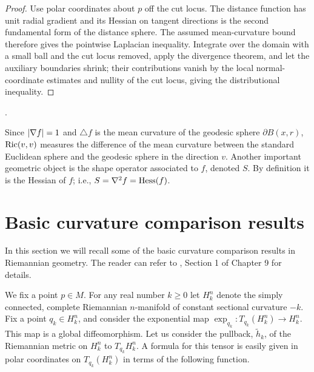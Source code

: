 \begin{proof}
\sketch

Use polar coordinates about $p$ off the cut locus. The distance function has unit radial gradient and its Hessian on tangent directions is the second fundamental form of the distance sphere. The assumed mean-curvature bound therefore gives the pointwise Laplacian inequality. Integrate over the domain with a small ball and the cut locus removed, apply the divergence theorem, and let the auxiliary boundaries shrink; their contributions vanish by the local normal-coordinate estimates and nullity of the cut locus, giving the distributional inequality.
\end{proof}
.

\medskip

Since $\left\vert\nabla f\right\vert = 1$ and $\triangle f$ is the mean curvature
of the geodesic sphere $\partial B(x,r)$, $\operatorname{Ric}(v,v)$ measures
the difference of the mean curvature between the standard Euclidean
sphere and the geodesic sphere in the direction $v$. Another
important geometric object  is the shape operator associated to $f$,
denoted $S$. By definition it is the Hessian of $f$; i.e.,
$S=\nabla^2f=\operatorname{Hess}(f)$.

\section{Basic curvature comparison results}
In this section we will recall some of the basic curvature
comparison results in Riemannian geometry. The reader can refer to
\cite{Petersen}, Section 1 of Chapter 9 for details.

\smallskip

We fix a point $p\in M$. For any real number $k\ge 0$ let $H^n_k$ denote the
simply connected, complete Riemannian $n$-manifold of constant sectional
curvature $-k$. Fix a point $q_k\in H^n_k$, and consider the exponential map
$\exp_{q_k}\colon T_{q_k}(H^n_k)\to H^n_k$. This map is a global
diffeomorphism. Let us consider the pullback, $\tilde h_k$, of the Riemannian
metric on $H^n_k$ to $T_{q_k}H^n_k$. A formula for this tensor is easily given
in polar coordinates on $T_{q_k}(H^n_k)$ in terms of the following function.

